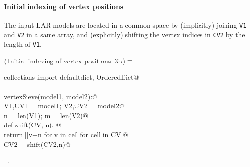 \documentclass[11pt,oneside]{article}	%
\begin{document}
\paragraph{Initial indexing of vertex positions}
The input LAR models are located in a common space by (implicitly) joining \texttt{V1} and \texttt{V2} in a same array, and (explicitly) shifting the vertex indices in \texttt{CV2} by the length of \texttt{V1}.
\begin{flushleft} \small \label{scrap4}
\protect{}$\langle\,$Initial indexing of vertex positions\nobreak\ {\footnotesize 3b}$\,\rangle\equiv$
\vspace{-1ex}
\begin{list}{}{} \item
\mbox{}\verb@from collections import defaultdict, OrderedDict@\\
\mbox{}\verb@@\\
\mbox{}\verb@def vertexSieve(model1, model2):@\\
\mbox{}\verb@   V1,CV1 = model1; V2,CV2 = model2@\\
\mbox{}\verb@   n = len(V1); m = len(V2)@\\
\mbox{}\verb@   def shift(CV, n): @\\
\mbox{}\verb@      return [[v+n for v in cell]for cell in CV]@\\
\mbox{}\verb@   CV2 = shift(CV2,n)@\\
\mbox{}\verb@@{\NWsep}
\end{list}
\vspace{-1ex}
\footnotesize\addtolength{\baselineskip}{-1ex}
\begin{list}{}{\setlength{\itemsep}{-\parsep}\setlength{\itemindent}{-\leftmargin}}
\item \NWtxtMacroRefIn\ .
\end{list}
\end{flushleft}
\end{document}

